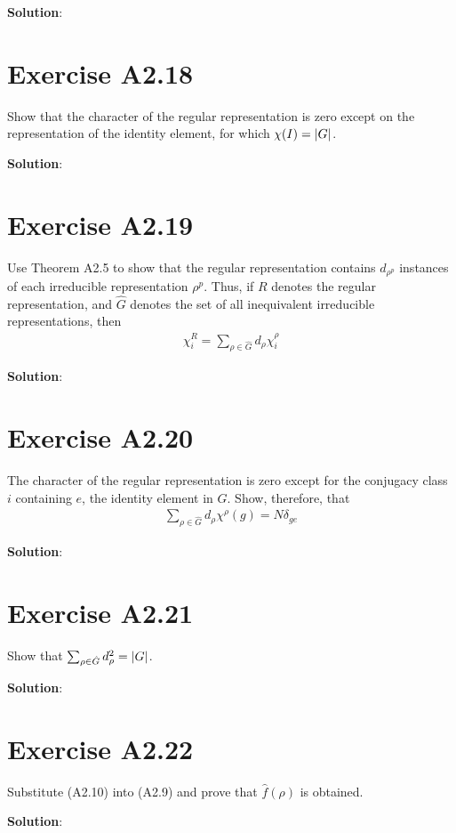 \documentclass{book}
\begin{document}
    \textbf{Solution}:

\section*{Exercise A2.18}
    Show that the character of the regular representation is zero except on the representation of the identity element, for which $\chi(I) = \abs{G}$.
    
    \textbf{Solution}:
    
\section*{Exercise A2.19}
    Use Theorem A2.5 to show that the regular representation contains $d_{\rho^p}$ instances of each irreducible representation $\rho^p$. Thus, if $R$ denotes the regular representation, and $\hat{G}$ denotes the set of all inequivalent irreducible representations, then
    \begin{align}
        \chi_i^R = \sum_{\rho\in\hat{G}} d_\rho \chi_i^\rho
    \end{align}
    
    \textbf{Solution}:
    
\section*{Exercise A2.20}
    The character of the regular representation is zero except for the conjugacy class $i$ containing $e$, the identity element in $G$. Show, therefore, that
    \begin{align}
        \sum_{\rho\in\hat{G}} d_\rho \chi^{\rho}(g) = N \delta_{ge}
    \end{align}
    
    \textbf{Solution}:

\section*{Exercise A2.21}
    Show that $\sum_{\rho\in\hat{G}} d_\rho^2 = \abs{G}$.
    
    \textbf{Solution}:

\section*{Exercise A2.22}
    Substitute (A2.10) into (A2.9) and prove that $\hat{f}(\rho)$ is obtained.
    
    \textbf{Solution}:
\end{document}
